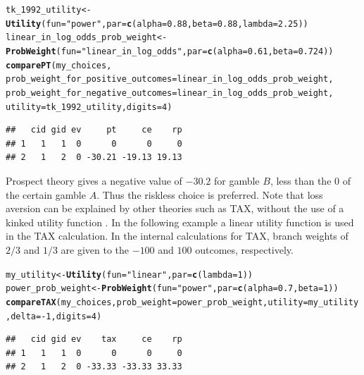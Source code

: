 \documentclass{article}\usepackage[]{graphicx}\usepackage[]{color}
\makeatletter
\newcommand{\hlnum}[1]{\textcolor[rgb]{0.686,0.059,0.569}{#1}}%
\newcommand{\hlstr}[1]{\textcolor[rgb]{0.192,0.494,0.8}{#1}}%
\newcommand{\hlopt}[1]{\textcolor[rgb]{0,0,0}{#1}}%
\newcommand{\hlstd}[1]{\textcolor[rgb]{0.345,0.345,0.345}{#1}}%
\newcommand{\hlkwb}[1]{\textcolor[rgb]{0.69,0.353,0.396}{#1}}%
\newcommand{\hlkwc}[1]{\textcolor[rgb]{0.333,0.667,0.333}{#1}}%
\newcommand{\hlkwd}[1]{\textcolor[rgb]{0.737,0.353,0.396}{\textbf{#1}}}%
\newenvironment{kframe}{%
 \def\at@end@of@kframe{}%
 \ifinner\ifhmode%
  \def\at@end@of@kframe{\end{minipage}}%
  \begin{minipage}{\columnwidth}%
 \fi\fi%
 \def\FrameCommand##1{\hskip\@totalleftmargin \hskip-\fboxsep
 \colorbox{shadecolor}{##1}\hskip-\fboxsep
     \hskip-\linewidth \hskip-\@totalleftmargin \hskip\columnwidth}%
 \MakeFramed {\advance\hsize-\width
   \@totalleftmargin\z@ \linewidth\hsize
   \@setminipage}}%
 {\par\unskip\endMakeFramed%
 \at@end@of@kframe}
\newenvironment{knitrout}{}{} %
\makeatother
\begin{document}
\begin{knitrout}
\color{fgcolor}\begin{kframe}
\begin{alltt}
\hlstd{tk_1992_utility} \hlkwb{<-} \hlkwd{Utility}\hlstd{(}\hlkwc{fun}\hlstd{=}\hlstr{"power"}\hlstd{,} \hlkwc{par}\hlstd{=}\hlkwd{c}\hlstd{(}\hlkwc{alpha}\hlstd{=}\hlnum{0.88}\hlstd{,} \hlkwc{beta}\hlstd{=}\hlnum{0.88}\hlstd{,} \hlkwc{lambda}\hlstd{=}\hlnum{2.25}\hlstd{))}
\hlstd{linear_in_log_odds_prob_weight} \hlkwb{<-} \hlkwd{ProbWeight}\hlstd{(}\hlkwc{fun}\hlstd{=}\hlstr{"linear_in_log_odds"}\hlstd{,} \hlkwc{par}\hlstd{=}\hlkwd{c}\hlstd{(}\hlkwc{alpha}\hlstd{=}\hlnum{0.61}\hlstd{,} \hlkwc{beta}\hlstd{=}\hlnum{0.724}\hlstd{))}
\hlkwd{comparePT}\hlstd{(my_choices,}
        \hlkwc{prob_weight_for_positive_outcomes}\hlstd{=linear_in_log_odds_prob_weight,}
        \hlkwc{prob_weight_for_negative_outcomes}\hlstd{=linear_in_log_odds_prob_weight,}
        \hlkwc{utility}\hlstd{=tk_1992_utility,} \hlkwc{digits}\hlstd{=}\hlnum{4}\hlstd{)}
\end{alltt}
\begin{verbatim}
##   cid gid ev     pt     ce    rp
## 1   1   1  0      0      0     0
## 2   1   2  0 -30.21 -19.13 19.13
\end{verbatim}
\end{kframe}
\end{knitrout}


Prospect theory gives a negative value of $-30.2$ for gamble $B$, less than the $0$ of the certain gamble $A$. Thus
the riskless choice is preferred.
Note that loss aversion can be explained by other theories such as TAX, without the use of a kinked utility
function \citep*{Birnbaum_2006}. In the following example a linear utility function is used in the TAX calculation. In the internal calculations for TAX, branch weights of $2/3$ and
$1/3$ are given to the $-100$ and $100$ outcomes, respectively.

\begin{knitrout}
\color{fgcolor}\begin{kframe}
\begin{alltt}
\hlstd{my_utility} \hlkwb{<-} \hlkwd{Utility}\hlstd{(}\hlkwc{fun}\hlstd{=}\hlstr{"linear"}\hlstd{,} \hlkwc{par}\hlstd{=}\hlkwd{c}\hlstd{(}\hlkwc{lambda}\hlstd{=}\hlnum{1}\hlstd{))}
\hlstd{power_prob_weight} \hlkwb{<-} \hlkwd{ProbWeight}\hlstd{(}\hlkwc{fun}\hlstd{=}\hlstr{"power"}\hlstd{,} \hlkwc{par}\hlstd{=}\hlkwd{c}\hlstd{(}\hlkwc{alpha}\hlstd{=}\hlnum{0.7}\hlstd{,} \hlkwc{beta}\hlstd{=}\hlnum{1}\hlstd{))}
\hlkwd{compareTAX}\hlstd{(my_choices,} \hlkwc{prob_weight}\hlstd{=power_prob_weight,} \hlkwc{utility}\hlstd{=my_utility,} \hlkwc{delta}\hlstd{=}\hlopt{-}\hlnum{1}\hlstd{,} \hlkwc{digits}\hlstd{=}\hlnum{4}\hlstd{)}
\end{alltt}
\begin{verbatim}
##   cid gid ev    tax     ce    rp
## 1   1   1  0      0      0     0
## 2   1   2  0 -33.33 -33.33 33.33
\end{verbatim}
\end{kframe}
\end{knitrout}
\end{document}
